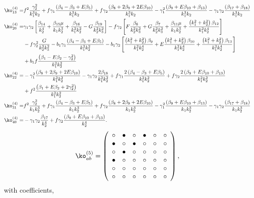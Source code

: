{\begin{align*}
\ko_{13}^{(4)}=& f^2 \frac{\gamma_2^2}{k_1^3 k_2} + f \gamma_1 \frac{\left( {\beta_{4}-\beta_{3}} + E \beta_{5} \right)}{k_1^3 k_2} + f \gamma_2 \frac{\left( \beta_{8} + 2 \beta_{9} + 2 E \beta_{10} \right)}{k_1^3 k_2} - \gamma_1^2 \frac{\left( \beta_{9} + E \beta_{10} + \beta_{13} \right)}{k_1^3 k_2} - \gamma_1 \gamma_2 \frac{\left( \beta_{17} + \beta_{18} \right)}{k_1^3 k_2} \\
\ko_{20}^{(4)}=& \gamma_1 \gamma_2 \left[ \frac{\beta_{14}}{k_2^4} + \frac{\beta_{15} \mu }{k_1 k_2^3} + \frac{\beta_{16}}{k_1^2 k_2^2} - G \frac{\beta_{19}}{k_2^2 k_3^2} \right] - f \gamma_2 \left[ F \frac{\beta_{6}}{k_2^2 k_3^2} + G \frac{\beta_{7}}{k_2^2 k_3^2} + \frac{\beta_{11} \mu}{k_1 k_2^3} + \frac{\left( k_1^2 + k_2^2 \right) \beta_{12}}{k_1^2 k_2^4} \right] \\
&- f \gamma_2^2 \frac{G}{k_2^2 k_3^2} - b_1 \gamma_1 \frac{\left( {\beta_{4}-\beta_{3}} + E \beta_{5} \right)}{k_1^2 k_2^2} - b_1 \gamma_2 \left[ \frac{\left( k_1^2 + k_2^2 \right) \beta_{9}}{k_1^2 k_2^4} + E \frac{\left( k_1^2 + k_2^2 \right) \beta_{10} }{k_1^2 k_2^4} + \frac{\left( k_1^2 + k_2^2 \right) \beta_{13}}{k_1^2 k_2^4} \right] \\
&+ b_1 f \frac{\left( \beta_1 - E \beta_2 - \gamma_2^2 \right)}{k_1^2 k_2^2} \\
\ko_{22}^{(4)}=& - \gamma_1^2 \frac{\left( \beta_{8} + 2 \beta_{9} + 2 E \beta_{10} \right)}{k_1^2 k_2^2} - \gamma_1 \gamma_2 \frac{2 \beta_{18}}{k_1^2 k_2^2}+  f \gamma_1 \frac{2\left( {\beta_{4}-\beta_{3}} + E \beta_{5} \right)}{k_1^2 k_2^2} + f \gamma_2 \frac{2 \left( \beta_{9} + E \beta_{10} + \beta_{13} \right)}{k_1^2 k_2^2} \\
&+ f^2 \frac{\left( \beta_1 + E \beta_2 + 2 \gamma_2^2 \right)}{k_1^2 k_2^2} \\
\ko_{31}^{(4)}=& f^2 \frac{\gamma_2^2}{k_1 k_2^3} + f \gamma_1 \frac{\left( {\beta_{4}-\beta_{3}} + E \beta_{5}\right)}{k_1 k_2^3} + f \gamma_2 \frac{\left( \beta_{8} + 2 \beta_{9} + 2 E \beta_{10}  \right)}{k_1 k_2^3} - \gamma_1^2 \frac{\left( \beta_{9} + E \beta_{10} + \beta_{13} \right)}{k_1 k_2^3} - \gamma_1 \gamma_2 \frac{\left( \beta_{17} + \beta_{18} \right)}{k_1 k_2^3} \\
\ko_{40}^{(4)}=&  - \gamma_1 \gamma_2 \frac{\beta_{17}}{k_2^4} + f \gamma_2 \frac{\left( \beta_{9} + E \beta_{10} + \beta_{13} \right)}{k_2^4}  .
\end{align*}
\begin{equation}
	\ko^{(5)}_{ab}= 
 \left( \begin {array}{cccccc} \circ &\bullet &\circ &\bullet 
&\circ &\circ \\  \bullet &\circ &\bullet &
\circ &\circ &\circ \\  \circ &\bullet &
\circ &\circ &\circ &\circ \\  \bullet &
\circ &\circ &\circ &\circ &\circ \\  
\circ &\circ &\circ &\circ &\circ &\circ 
\\  \circ &\circ &\circ &\circ &\circ &
\circ \end {array} \right), 
\end{equation}
with coefficients, 

}
